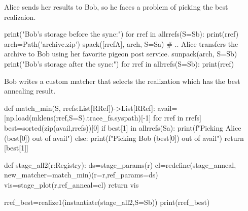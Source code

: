 Alice sends her results to Bob, so he faces a problem of picking the best
realizaion.

\begin{pythontexcode}
print("Bob's storage before the sync:")
for rref in allrrefs(S=Sb):
  print(rref)
arch=Path('archive.zip')
spack([rrefA], arch, S=Sa)
# .. Alice transfers the archive to Bob using her favorite pigeon post service.
sunpack(arch, S=Sb)
print("Bob's storage after the sync:")
for rref in allrrefs(S=Sb):
  print(rref)
\end{pythontexcode}

\mystdout


Bob writes a custom matcher that selects the realization which has the best
annealing result.

\begin{pythontexcode}
def match_min(S, rrefs:List[RRef])->List[RRef]:
  avail=[np.load(mklens(rref,S=S).trace_fs.syspath)[-1] for rref in rrefs]
  best=sorted(zip(avail,rrefs))[0]
  if best[1] in allrrefs(Sa):
    print(f"Picking Alice ({best[0]}) out of {avail}")
  else:
    print(f"Picking Bob ({best[0]}) out of {avail}")
  return [best[1]]

def stage_all2(r:Registry):
  ds=stage_params(r)
  cl=redefine(stage_anneal, new_matcher=match_min)(r=r,ref_params=ds)
  vis=stage_plot(r,ref_anneal=cl)
  return vis

rref_best=realize1(instantiate(stage_all2,S=Sb))
print(rref_best)
\end{pythontexcode}

\mystdout
